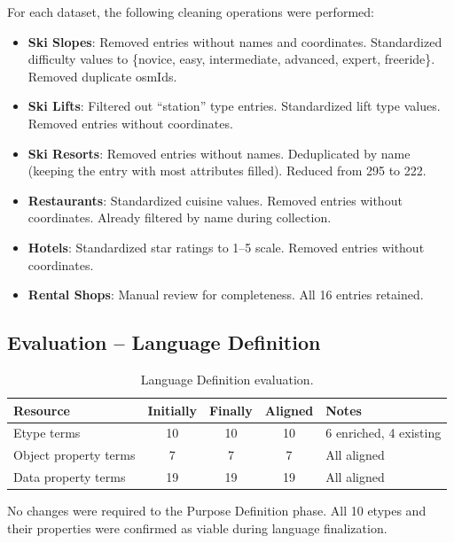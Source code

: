 For each dataset, the following cleaning operations were performed:
\begin{itemize}
    \item \textbf{Ski Slopes}: Removed entries without names and coordinates. Standardized difficulty values to \{novice, easy, intermediate, advanced, expert, freeride\}. Removed duplicate osmIds.
    \item \textbf{Ski Lifts}: Filtered out ``station'' type entries. Standardized lift type values. Removed entries without coordinates.
    \item \textbf{Ski Resorts}: Removed entries without names. Deduplicated by name (keeping the entry with most attributes filled). Reduced from 295 to 222.
    \item \textbf{Restaurants}: Standardized cuisine values. Removed entries without coordinates. Already filtered by name during collection.
    \item \textbf{Hotels}: Standardized star ratings to 1--5 scale. Removed entries without coordinates.
    \item \textbf{Rental Shops}: Manual review for completeness. All 16 entries retained.
\end{itemize}

\subsection{Evaluation -- Language Definition}

\begin{table}[h!]
\centering
\small
\begin{tabular}{|l|c|c|c|l|}
\hline
\textbf{Resource} & \textbf{Initially} & \textbf{Finally} & \textbf{Aligned} & \textbf{Notes} \\
\hline
Etype terms & 10 & 10 & 10 & 6 enriched, 4 existing \\
Object property terms & 7 & 7 & 7 & All aligned \\
Data property terms & 19 & 19 & 19 & All aligned \\
\hline
\end{tabular}
\caption{Language Definition evaluation.}
\end{table}

\noindent No changes were required to the Purpose Definition phase. All 10 etypes and their properties were confirmed as viable during language finalization.
